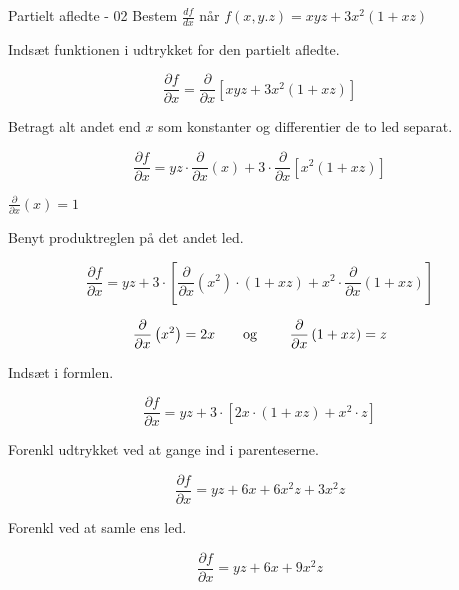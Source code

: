 \documentclass{article}
\begin{document}
\begin{exercise}{Partielt afledte - 02}
	Bestem $\frac{df}{dx}$ når $f(x,y.z) =xyz+3x^2(1+xz) $ 
	
	
	\hint
	Indsæt funktionen i udtrykket for den partielt afledte.
	
	\hint
	
	\[
	\frac{\partial f}{\partial x} = \frac{\partial }{\partial x} \left[ xyz+3x^2(1+xz)\right]
	\]
	
	\hint
	Betragt alt andet end $x$ som konstanter og differentier de to led separat.
	
	\hint
	\[
	\frac{\partial f}{\partial x} = yz \cdot \frac{\partial}{\partial x} \left( x \right) + 3 \cdot \frac{\partial }{\partial x} \left[ x^2\left(1+xz \right) \right]
	\]
	
	\hint
	$\frac{\partial}{\partial x} (x) = 1$
	
	\hint
	
	Benyt produktreglen på det andet led.
	
	\hint
	\[
	\frac{\partial f}{\partial x} = yz + 3 \cdot \left[\frac{\partial }{\partial x}\left(x^2 \right) \cdot \left(1+xz \right) + x^2 \cdot \frac{\partial}{\partial x} \left( 1+xz\right) \right]
	\]
	
	\hint
	\[ \frac{\partial }{\partial x} \left(x^2\right) = 2x \textrm{\qquad og \qquad}  \frac{\partial }{\partial x} \left(1+xz\right) = z
	\]
	
	\hint
	Indsæt i formlen.
	
	\hint
	\[
	\frac{\partial f}{\partial x} = yz +  3 \cdot \left[2x \cdot \left( 1+xz\right) + x^2 \cdot z \right]
	\]
	
	\hint
	Forenkl udtrykket ved at gange ind i parenteserne.
	
	\hint
	\[
	\frac{\partial f}{\partial x} = yz +  6x+6x^2z + 3x^2z 
	\]
	
	\hint 
	Forenkl ved at samle ens led.
	
	\hint
	\[
	\frac{\partial f}{\partial x} = yz + 6x + 9x^2z
	\]
	
\end{exercise}

\newpage
\end{document}
